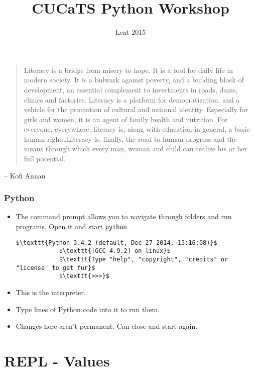\documentclass[presentation]{beamer}
\title{CUCaTS Python Workshop}
\date{Lent 2015}
\begin{document}
	
	\begin{frame}[fragile]
		\maketitle
	\end{frame}
	
	\begin{frame}[fragile]
		\begin{quotation}
			Literacy is a bridge from misery to hope. It is a tool for daily life in modern society. It is a bulwark against poverty, and a building block of development, an essential complement to investments in roads, dams, clinics and factories. Literacy is a platform for democratization, and a vehicle for the promotion of cultural and national identity. Especially for girls and women, it is an agent of family health and nutrition. For everyone, everywhere, literacy is, along with education in general, a basic human right\dots Literacy is, finally, the road to human progress and the means through which every man, woman and child can realize his or her full potential.
		\end{quotation}
		\hfill  -- Kofi Annan
	\end{frame}
	
	\begin{frame}[fragile]
		\frametitle{Python}
		\begin{itemize}
			\item The \colorbox{jargonbg}{command prompt} allows you to navigate through folders and run programs. Open it and start \lstinline|python|.
			\begin{lstlisting}[xleftmargin=\dimexpr-\leftmargini]
			$\texttt{Python 3.4.2 (default, Dec 27 2014, 13:16:08)}$
			$\texttt{[GCC 4.9.2] on linux}$
			$\texttt{Type "help", "copyright", "credits" or "license" to get fur}$
			$\texttt{>>>}$
			\end{lstlisting}
			\item This is the \colorbox{jargonbg}{interpreter}.
			\item Type lines of Python code into it to run them.
			\item Changes here aren't permanent. Can close and start again.
		\end{itemize}
	\end{frame}
	
	\section{REPL - Values}
	
\end{document}
